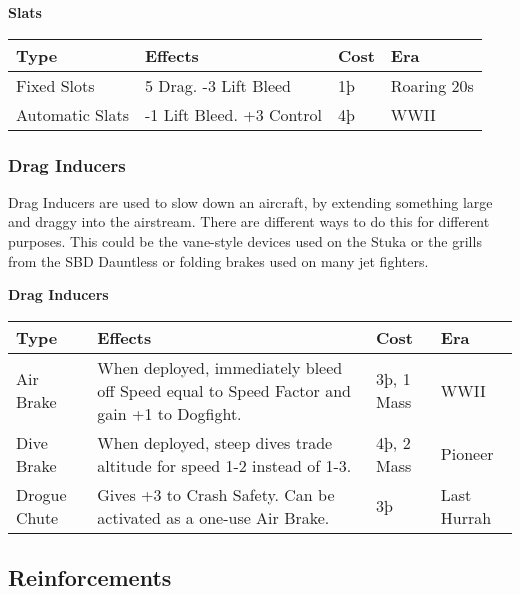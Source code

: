 \documentclass{article}
\begin{document}
\textbf{Slats}

\begin{tabular}{|l|l|l|l|}
    \hline
    Type            & Effects                   & Cost & Era         \\\hline
    Fixed Slots     & 5 Drag. -3 Lift Bleed     & 1þ   & Roaring 20s \\\hline
    Automatic Slats & -1 Lift Bleed. +3 Control & 4þ   & WWII        \\\hline
\end{tabular}

\subsubsection{Drag Inducers}
\label{_Drag_Inducers}

Drag Inducers are used to slow down an aircraft, by extending something
large and draggy into the airstream. There are different ways to do this
for different purposes. This could be the vane-style devices used on the
Stuka or the grills from the SBD Dauntless or folding brakes used on
many jet fighters.

\textbf{Drag Inducers}

\begin{tabular}{|l|l|l|l|}
    \hline
    Type                            & Effects                                                   & Cost        & Era \\\hline
    Air Brake                       & When deployed, immediately bleed off Speed equal to Speed
    Factor and gain +1 to Dogfight. & 3þ, 1 Mass                                                & WWII              \\\hline
    Dive Brake                      & When deployed, steep dives trade altitude for speed 1-2
    instead of 1-3.                 & 4þ, 2 Mass                                                & Pioneer           \\\hline
    Drogue Chute                    & Gives +3 to Crash Safety. Can be activated as a one-use
    Air Brake.                      & 3þ                                                        & Last Hurrah       \\\hline
\end{tabular}

\subsection{Reinforcements}
\label{_Reinforcement}
\end{document}
